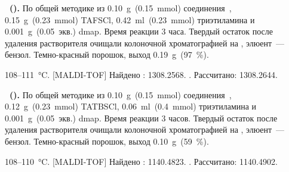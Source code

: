 \textbf{~().} 
По общей методике из \SI{0.10}{\gram}~(\SI{0.15}{\milli\mole}) соединения~, \SI{0.15}{\gram}~(\SI{0.23}{\milli\mole}) TAFSCl, \SI{0.42}{\milli\litre}~(\SI{0.23}{\milli\mole}) триэтиламина и \SI{0.001}{\gram}~(0.05~экв.) \ac{dmap}.
Время реакции 3 часа. Твердый остаток после удаления растворителя очищали колоночной хроматографией на , элюент~--- бензол.
Темно-красный порошок, выход \SI{0.19}{\gram}~(\SI{97}{\percent}).
\begin{experimental}
     108--\SI{111}{\celsius}.
    [MALDI-TOF] Найдено \ce{[M + H]+}: \num{1308.2568}. . Рассчитано: \ce{[M + H]} \num{1308.2644}.
\end{experimental}


\textbf{~().} 
По общей методике из \SI{0.10}{\gram}~(\SI{0.15}{\milli\mole}) соединения~, \SI{0.12}{\gram}~(\SI{0.23}{\milli\mole}) TATBSCl, \SI{0.06}{\milli\litre}~(\SI{0.4}{\milli\mole}) триэтиламина и \SI{0.001}{\gram}~(0.05~экв.) \ac{dmap}.
Время реакции 3 часов. Твердый остаток после удаления растворителя очищали колоночной хроматографией на , элюент~--- бензол.
Темно-красный порошок, выход \SI{0.10}{\gram}~(\SI{59}{\percent}).
\begin{experimental}
     108--\SI{110}{\celsius}.
    [MALDI-TOF] Найдено \ce{[M + H]+}: \num{1140.4823}. . Рассчитано: \ce{[M + H]} \num{1140.4902}.
\end{experimental}

